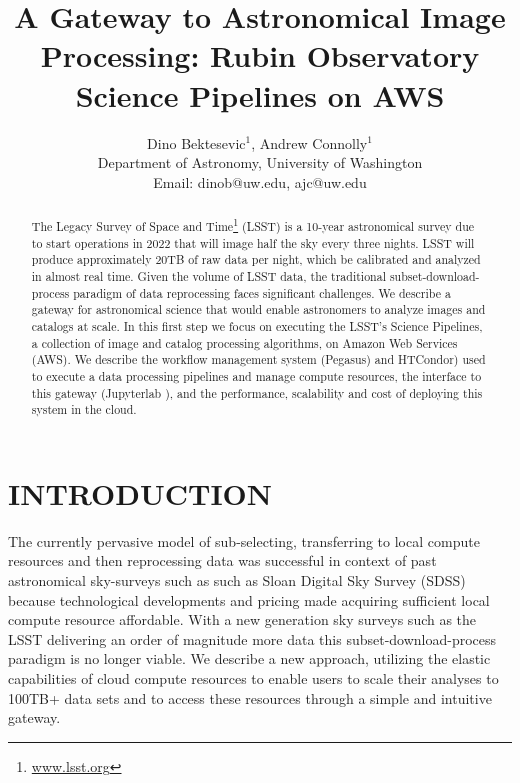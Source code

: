 \documentclass[a4paper, 10pt, conference]{ieeeconf}
\title{\LARGE \bf
A Gateway to Astronomical Image Processing: Rubin Observatory Science Pipelines on AWS
}
\author{
    Dino Bektesevic$^1$, Andrew Connolly$^1$ \\
    Department of Astronomy, University of Washington \\ Email: dinob@uw.edu, ajc@uw.edu
    }
\begin{document}
\maketitle


\begin{abstract}

The Legacy Survey of Space and Time\footnote{\url{www.lsst.org}} (LSST) is a 10-year astronomical survey due to start operations in 2022 that will image half the sky every three nights. LSST will produce approximately 20TB of raw data per night, which be calibrated and analyzed in almost real time.  Given the volume of LSST data, the traditional subset-download-process paradigm of data reprocessing faces significant challenges. We describe a gateway for astronomical science that would enable astronomers to analyze images and catalogs at scale. In this first step we focus on executing the LSST's Science Pipelines, a collection of image and catalog processing algorithms, on Amazon Web Services (AWS). We describe the workflow management system (Pegasus\cite{}) and HTCondor\cite{}) used to execute a data processing pipelines and manage compute resources, the interface to this gateway (Jupyterlab \cite{}), and the performance, scalability and cost of deploying this system in the cloud.
\end{abstract}

\section{INTRODUCTION}

The currently pervasive model of sub-selecting, transferring to local compute resources and then reprocessing data was successful in context of past astronomical sky-surveys such as such as Sloan Digital Sky Survey\cite{York2000} (SDSS) because technological developments and pricing made acquiring sufficient local compute resource affordable. With a new generation sky surveys such as the LSST delivering an order of magnitude more data this subset-download-process paradigm is no longer viable. We describe a new approach, utilizing the elastic capabilities of cloud compute resources to enable users to scale their analyses to 100TB+ data sets and to access these resources through a simple and intuitive gateway.
\end{document}

